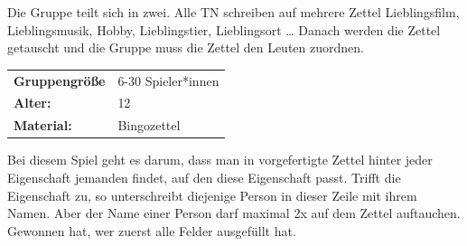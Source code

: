 Die Gruppe teilt sich in zwei. Alle TN schreiben auf mehrere Zettel Lieblingsfilm, Lieblingsmusik, Hobby, Lieblingstier, Lieblingsort … Danach werden die Zettel getauscht und die Gruppe muss die Zettel den Leuten zuordnen. \\



\begin{table}[H]
\begin{tabular}{>{\bfseries}lp{8cm}}
   Gruppengröße   & 6-30 Spieler*innen\\
    Alter: & 12 \\
    Material: & Bingozettel \\
\end{tabular}
\end{table} 
 Bei diesem Spiel geht es darum, dass man in vorgefertigte Zettel hinter jeder Eigenschaft jemanden findet, auf den diese Eigenschaft passt. Trifft die Eigenschaft zu, so unterschreibt diejenige Person in dieser Zeile mit ihrem Namen. Aber der Name einer Person darf maximal 2x auf dem Zettel auftauchen. Gewonnen hat, wer zuerst alle Felder ausgefüllt hat.\\




